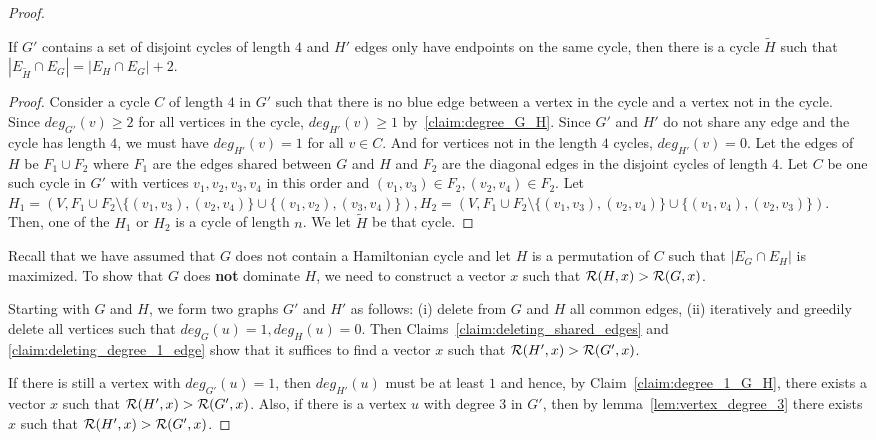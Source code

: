 \begin{proof}

\begin{lemma}\label{lem:cycles_length_4}
If $G'$ contains a set of disjoint cycles of length $4$ and $H'$ edges only have endpoints on the same cycle, then there is a cycle $\tilde{H}$ such that $|E_{\tilde{H}} \cap E_G| = |E_H \cap E_G|+2$.
\end{lemma}
\begin{proof}
 Consider a cycle $C$ of length $4$ in $G'$ such that there is no blue edge between a vertex in the cycle and a vertex not in the cycle. Since $deg_{G'}(v) \geq 2$ for all vertices in the cycle, $deg_{H'}(v) \geq 1$ by~\cref{claim:degree_G_H}. Since $G'$ and $H'$ do not share any edge and the cycle has length $4$, we must have $deg_{H'}(v) = 1$ for all $v \in C$. And for vertices not in the length $4$ cycles, $deg_{H'}(v) = 0$. Let the edges of $H$ be $F_1 \cup F_2$ where $F_1$ are the edges shared between $G$ and $H$ and $F_2$ are the diagonal edges in the disjoint cycles of length $4$. Let $C$ be one such cycle in $G'$ with vertices $v_1,v_2,v_3,v_4$ in this order and $(v_1,v_3) \in F_2, (v_2,v_4) \in F_2$. Let $H_1 = (V, F_1 \cup F_2 \setminus \{(v_1,v_3), (v_2,v_4)\}\cup \{(v_1,v_2),(v_3,v_4)\}), H_2 = (V,F_1 \cup F_2 \setminus \{(v_1,v_3), (v_2,v_4)\}\cup \{(v_1,v_4),(v_2,v_3)\})$. Then, one of the $H_1$ or $H_2$ is a cycle of length $n$. We let $\tilde{H}$ be that cycle. 
\end{proof}

  Recall that we have assumed that $G$ does not contain a Hamiltonian cycle and let $H$ is a permutation of $C$ such that $|E_G\cap E_H|$ is maximized. To show that $G$ does \textbf{not} dominate $H$, we need to construct a vector $x$ such that ${\cal R}(H,x)>{\cal R}(G,x)$. 

Starting with $G$ and $H$, we form two graphs $G'$ and $H'$ as follows: (i) delete from $G$ and $H$ all common edges, (ii) iteratively and greedily delete all vertices such that $deg_{G}(u) = 1, deg_{H}(u) = 0$. Then Claims~\ref{claim:deleting_shared_edges} and \ref{claim:deleting_degree_1_edge} show that it suffices to find a vector $x$ such that ${\cal R}(H',x)>{\cal R}(G',x)$. 

If there is still a vertex with $deg_{G'}(u) = 1$, then $deg_{H'}(u)$ must be at least $1$ and hence, by Claim~\ref{claim:degree_1_G_H}, there exists a vector $x$ such that ${\cal R}(H',x) > {\cal R}(G',x)$. 
Also, if there is a vertex $u$ with degree $3$ in $G'$, then by lemma~\ref{lem:vertex_degree_3} there exists $x$ such that ${\cal R}(H',x)>{\cal R}(G',x)$.


\end{proof}
